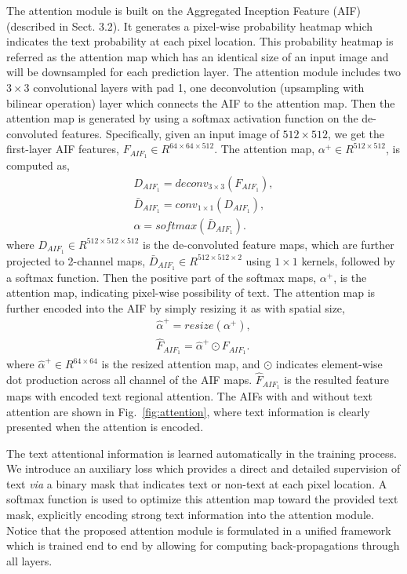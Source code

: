\documentclass[10pt,twocolumn,letterpaper]{article}
\begin{document}
The attention module is built on the Aggregated Inception Feature (AIF) (described in Sect. 3.2). It generates a pixel-wise probability heatmap which indicates the text probability at each pixel location. This probability heatmap is referred as the attention map which has an identical size of an input image and will be downsampled for each prediction layer. The attention module includes two $3\times3$ convolutional layers with pad 1, one deconvolution (upsampling with bilinear operation) layer which connects the AIF to the attention map. Then the attention map is generated by using a softmax activation function on the de-convoluted features. Specifically, given an input image of $512 \times 512$, we get the first-layer AIF features, $F_{AIF_1} \in R^{64\times 64\times 512}$. The attention map, $\alpha^{+} \in R^{512 \times 512}$, is computed as,
\begin{align}
D_{AIF_1} = deconv_{3\times3}(F_{AIF_1}), \\
\bar{D}_{AIF_1} = conv_{1\times1}(D_{AIF_1}), \\
\alpha = softmax(\bar{D}_{AIF_1}).
\end{align}
where $D_{AIF_1} \in R^{512 \times 512 \times 512}$ is the de-convoluted feature maps, which are further projected to 2-channel maps, $\bar{D}_{AIF_1} \in R^{512 \times 512 \times 2}$ using $1\times1$ kernels, followed by a softmax function. Then the positive part of the softmax maps, $\alpha^{+}$, is the attention map, indicating pixel-wise possibility of text. The attention map is further encoded into the AIF by simply resizing it as with spatial size,
\begin{align}
\hat{\alpha}^{+} = resize(\alpha^{+}), \\
\hat{F}_{AIF_1} = \hat{\alpha}^{+} \odot F_{AIF_1}.
\end{align}
where $\hat{\alpha}^{+} \in R^{64 \times 64}$  is the resized attention map, and $\odot$ indicates element-wise dot production across all channel of the AIF maps. $\hat{F}_{AIF_1}$ is the resulted feature maps with encoded text regional attention. The AIFs with and without text attention are shown in Fig.~\ref{fig:attention}, where text information is clearly presented when the attention is encoded.

The text attentional information is learned automatically in the training process. We introduce an auxiliary loss which provides a direct and detailed supervision of text \textit{via} a binary mask that indicates text or non-text at each pixel location.  A softmax function is used to optimize this attention map toward the provided text mask, explicitly encoding strong text information into the attention module. Notice that the proposed attention module is formulated in a unified framework which is trained end to end by allowing for computing back-propagations through all layers.
\end{document}

